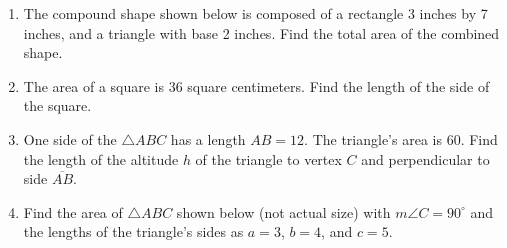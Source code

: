 \begin{enumerate}
\item The compound shape shown below is composed of a rectangle 3 inches by 7 inches, and a triangle with base 2 inches. Find the total area of the combined shape.
    \vspace{0.5cm} 
    \begin{flushleft}
    \end{flushleft}
        
\item The area of a square is 36 square centimeters. Find the length of the side of the square. \vspace{3cm}

\item One side of the $\triangle ABC$ has a length $AB=12$. The triangle's area is 60. Find the length of the altitude $h$ of the triangle to vertex $C$ and perpendicular to side $\overline{AB}$.\\

\item Find the area of $\triangle ABC$ shown below (not actual size) with $m\angle C=90^\circ$ and the lengths of the triangle's sides as $a=3$, $b=4$, and $c=5$. 
\begin{flushright}
\end{flushright}
\vspace{1cm}


\end{enumerate}
